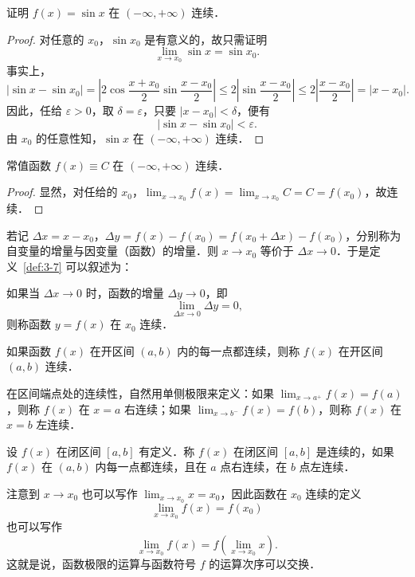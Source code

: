 \begin{example}\label{ex:3-4-1}
证明 $f(x) = \sin x$ 在 $(-\infty, +\infty)$ 连续．
\end{example}

\begin{proof}
对任意的 $x_0$，$\sin x_0$ 是有意义的，故只需证明
\[
\lim_{x \to x_0} \sin x = \sin x_0.
\]
事实上，
\[
|\sin x - \sin x_0| = \left|2\cos\frac{x+x_0}{2}\sin\frac{x-x_0}{2}\right| \leqslant 2\left|\sin\frac{x-x_0}{2}\right| \leqslant 2\left|\frac{x-x_0}{2}\right| = |x - x_0|.
\]
因此，任给 $\varepsilon > 0$，取 $\delta = \varepsilon$，只要 $|x - x_0| < \delta$，便有
\[
|\sin x - \sin x_0| < \varepsilon.
\]
由 $x_0$ 的任意性知，$\sin x$ 在 $(-\infty, +\infty)$ 连续．
\end{proof}

\begin{example}\label{ex:3-4-2}
常值函数 $f(x) \equiv C$ 在 $(-\infty, +\infty)$ 连续．
\end{example}

\begin{proof}
显然，对任给的 $x_0$，$\lim_{x \to x_0} f(x) = \lim_{x \to x_0} C = C = f(x_0)$，故连续．
\end{proof}

若记 $\Delta x = x - x_0$，$\Delta y = f(x) - f(x_0) = f(x_0 + \Delta x) - f(x_0)$，分别称为自变量的增量与因变量（函数）的增量．则 $x \to x_0$ 等价于 $\Delta x \to 0$．于是定义~\ref{def:3-7} 可以叙述为：

\begin{definition}\label{def:3-8}
如果当 $\Delta x \to 0$ 时，函数的增量 $\Delta y \to 0$，即
\[
\lim_{\Delta x \to 0} \Delta y = 0,
\]
则称函数 $y = f(x)$ 在 $x_0$ 连续．
\end{definition}

如果函数 $f(x)$ 在开区间 $(a, b)$ 内的每一点都连续，则称 $f(x)$ 在开区间 $(a, b)$ 连续．

在区间端点处的连续性，自然用单侧极限来定义：如果 $\lim_{x \to a^+} f(x) = f(a)$，则称 $f(x)$ 在 $x = a$ 右连续；如果 $\lim_{x \to b^-} f(x) = f(b)$，则称 $f(x)$ 在 $x = b$ 左连续．

\begin{definition}\label{def:3-9}
设 $f(x)$ 在闭区间 $[a, b]$ 有定义．称 $f(x)$ 在闭区间 $[a, b]$ 是连续的，如果 $f(x)$ 在 $(a, b)$ 内每一点都连续，且在 $a$ 点右连续，在 $b$ 点左连续．
\end{definition}

注意到 $x \to x_0$ 也可以写作 $\lim_{x \to x_0} x = x_0$，因此函数在 $x_0$ 连续的定义
\[
\lim_{x \to x_0} f(x) = f(x_0)
\]
也可以写作
\[
\lim_{x \to x_0} f(x) = f\left(\lim_{x \to x_0} x\right).
\]
这就是说，函数极限的运算与函数符号 $f$ 的运算次序可以交换．

